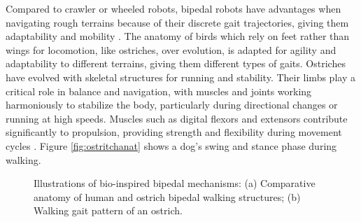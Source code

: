 \documentclass[12pt]{article}
\begin{document}
Compared to crawler or wheeled robots, bipedal robots have advantages when navigating rough terrains because of their discrete gait trajectories, giving them adaptability and mobility \cite{abourachid2016natural}. The anatomy of birds which rely on feet rather than wings for locomotion, like ostriches, over evolution, is adapted for agility and adaptability to different terrains, giving them different types of gaits. Ostriches have evolved with skeletal structures for running and stability. Their limbs play a critical role in balance and navigation, with muscles and joints working harmoniously to stabilize the body, particularly during directional changes or running at high speeds. Muscles such as digital flexors and extensors contribute significantly to propulsion, providing strength and flexibility during movement cycles \cite{rubenson2004gait}. Figure \ref{fig:ostritchanat} shows a dog's swing and stance phase during walking.


\begin{figure}[ht]
    \centering
    \caption{Illustrations of bio-inspired bipedal mechanisms: (a) Comparative anatomy of human and ostrich bipedal walking structures; (b) Walking gait pattern of an ostrich.}
    \label{fig:combinedfigure}
\end{figure}

\end{document}
